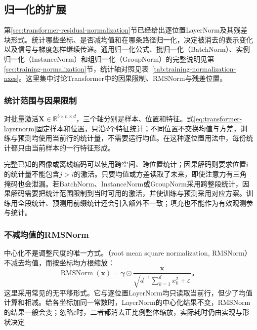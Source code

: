 \subsection{归一化的扩展}
\label{sec:transformer-normalization-extensions}

第\ref{sec:transformer-residual-normalization}节已经给出逐位置LayerNorm及其残差块形式。统计哪些坐标、是否减均值和在哪条路径归一化，决定被消去的表示变化以及信号与梯度怎样继续传递。通用归一化公式、批归一化（BatchNorm）、实例归一化（InstanceNorm）和组归一化（GroupNorm）的完整说明见第\ref{sec:training-normalization}节，统计轴对照见表~\ref{tab:training-normalization-axes}。这里集中讨论Transformer中的因果限制、RMSNorm与残差位置。

\subsubsection{统计范围与因果限制}

对批量激活$\bm X\in\mathbb R^{b\times n\times d}$，三个轴分别是样本、位置和特征。式\eqref{eq:transformer-layernorm}固定样本和位置，只沿$d$个特征统计；不同位置不交换均值与方差，训练与预测均使用当前行的统计量，不需要运行均值。在这种逐位置用法中，每份统计都只由当前样本的一行特征形成。

完整已知的图像或离线编码可以使用跨空间、跨位置统计；因果解码则要求位置$i$的统计量不能包含$j>i$的激活。只要均值或方差读取了未来，即使注意力有三角掩码也会泄漏。若BatchNorm、InstanceNorm或GroupNorm采用跨整段统计，因果解码需要把统计范围限制到当时可用的激活，并使训练与预测采用对应方案。训练用全段统计、预测用前缀统计还会引入额外不一致；填充也不能作为有效观测参与统计。

\subsubsection{不减均值的RMSNorm}

中心化不是调整尺度的唯一方式。（root mean square normalization, RMSNorm）不减去均值，而按坐标均方根缩放：
\begin{equation}
  \operatorname{RMSNorm}(\bm x)
    =\bm\gamma\odot\frac{\bm x}
       {\sqrt{d^{-1}\sum_{k=1}^d x_k^2+\varepsilon}}\text{。}
  \label{eq:transformer-rmsnorm}
\end{equation}
这里采用常见的无平移形式。它与逐位置LayerNorm均只读取当前行，但少了均值计算和相减。给各坐标加同一常数时，LayerNorm的中心化结果不变，RMSNorm的结果一般会变；忽略$\varepsilon$时，二者都消去正比例整体缩放，实际耗时仍由实现与形状决定

